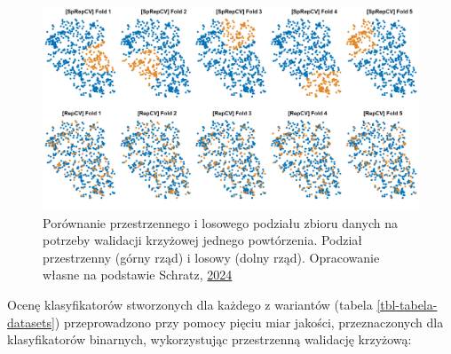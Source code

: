 \documentclass{amuthesis}
\begin{document}
\begin{figure}[t]

{\centering \includegraphics[width=1\textwidth,height=\textheight]{figures/spcv_plot.png}

}

\caption{\label{fig-rycina-spcv}Porównanie przestrzennego i losowego
podziału zbioru danych na potrzeby walidacji krzyżowej jednego
powtórzenia. Podział przestrzenny (górny rząd) i losowy (dolny rząd).
Opracowanie własne na podstawie Schratz,
\href{https://mlr.mlr-org.com/articles/tutorial/handling_of_spatial_data.html}{2024}}

\end{figure}

Ocenę klasyfikatorów stworzonych dla każdego z wariantów (tabela
\ref{tbl-tabela-datasets}) przeprowadzono przy pomocy pięciu miar
jakości, przeznaczonych dla klasyfikatorów binarnych, wykorzystując
przestrzenną walidację krzyżową:
\end{document}
